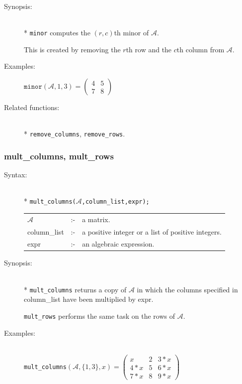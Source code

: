 {\begin{description}
\item[Synopsis:]\mbox{}\\*
                \texttt{minor} computes the $(r,c)$th minor of $\mathcal{A}$.

                This is created by removing the $r$th row and the $c$th
                column from $\mathcal{A}$.

\item[Examples:]
\begin{flushleft}
\(
\texttt{minor}(\mathcal{A},1,3)  =
        \begin{pmatrix} 4 & 5 \\ 7 & 8 \end{pmatrix}
\)
\end{flushleft}

\item[Related functions:]\mbox{}\\*
\texttt{remove\_columns}, \texttt{remove\_rows}.
\end{description}


\subsubsection{mult\_columns, mult\_rows}
\label{linalg:mult_columns}
\hypertarget{operator:MULT_COLUMNS}{}

\begin{description}
\item[Syntax:]\mbox{}\\*
{\tt mult\_columns($\mathcal{A}$,column\_list,expr);}\\[2mm]
\begin{tabular}{l l l}
$\mathcal{A}$   &:-& a matrix. \\
column\_list &:-& a positive integer or a list of positive integers. \\
expr        &:-& an algebraic expression.
\end{tabular}

\item[Synopsis:]\mbox{}\\*
\texttt{mult\_columns} returns a copy of $\mathcal{A}$ in which
                the columns specified in column\_list have been
multiplied by expr.

\texttt{mult\_rows} performs the same task on the rows of $\mathcal{A}$.

\item[Examples:]\mbox{}\\
  \texttt{mult\_columns}\((\mathcal{A},\{1,3\},x)  =
  \begin{pmatrix} x & 2 & 3*x \\ 4*x & 5 & 6*x \\ 7*x & 8 & 9*x \end{pmatrix}\)


\end{description}}
